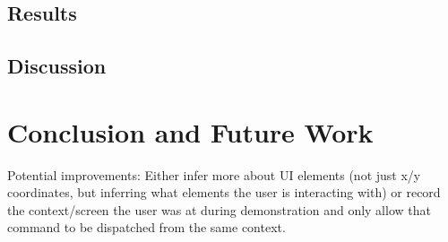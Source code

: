 \documentclass[letterpaper]{article}
\begin{document}
\subsection{Results}

\subsection{Discussion}

\section{Conclusion and Future Work}
Potential improvements: Either infer more about UI elements (not just 
x/y coordinates, but inferring what elements the user is interacting with)
or record the context/screen the user was at during demonstration and only allow 
that command to be dispatched from the same context.
\end{document}
